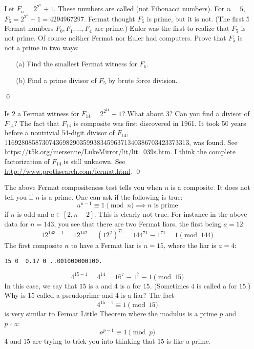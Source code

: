 \begin{ex}
  Let $F_n = 2^{2^n} + 1$.
  These numbers are called  (not Fibonacci numbers).
  For $n = 5$, $F_5 = 2^{2^5} + 1 = 4294967297$.
  Fermat thought $F_5$ is prime, but it is not.
  (The first 5 Fermat numbers $F_0, F_1, ..., F_4$ are prime.)
  Euler was the first to realize that $F_5$ is not prime.
  Of course neither Fermat nor Euler had computers.
  Prove that $F_5$ is not a prime in two ways:
  \begin{enumerate}[nosep]
    \item[(a)] Find the smallest Fermat witness for $F_5$.
    \item[(b)] Find a prime divisor of $F_5$ by brute force division.
  \end{enumerate}
  \qed
\end{ex}

\begin{ex}
  Is $2$ a Fermat witness for $F_{14} = 2^{2^{14}} + 1$?
  What about $3$?
  Can you find a divisor of $F_{14}$?
  The fact that $F_{14}$ is composite was first discovered in 1961.
  It took 50 years before a nontrivial 54-digit divisor of $F_{14}$,
  116928085873074369829035993834596371340386703423373313,
  was found.
  See \url{https://t5k.org/mersenne/LukeMirror/lit/lit_039s.htm}.
  I think the complete factorization of $F_{14}$ is still unknown.
  See \url{http://www.prothsearch.com/fermat.html}.
  \qed
\end{ex}

The above Fermat compositeness test tells you when $n$ is a composite.
It does not tell you if $n$ is a prime.
One can ask if the following is true: 
\[
a^{n-1} \equiv 1 \pmod{n} \implies n \text{ is prime}
\]
if $n$ is odd and $a \in [2, n-2]$.
This is clearly not true.
For instance in the above data for $n = 143$, you see that
there are two Fermat liars, the first being $a = 12$:
\[
12^{143 - 1} = 12^{142} = (12^2)^{71} = 144^{71} \equiv 1^{71} = 1 \pmod{144}
\]
The first composite $n$ to have a Fermat liar is $n = 15$, where the liar is $a = 4$:
\begin{Verbatim}[frame=single,fontsize=\footnotesize]
15 0  0.17 0 ..001000000100.
\end{Verbatim}
\[
4^{15 - 1} = 4^{14} = 16^7 \equiv 1^7 \equiv 1 \pmod{15} 
\]  
In this case,
we say that $15$ is a
and
$4$ is a
for $15$.
(Sometimes $4$ is called a
 for $15$.)
Why is $15$ called a pseudoprime and $4$ is a liar?
The fact
\[
4^{15 - 1} \equiv 1 \pmod{15} 
\]
is very similar to Fermat Little Theorem where the modulus is a prime $p$ and $p \nmid a$:
\[
a^{p - 1} \equiv 1 \pmod{p} 
\]
$4$ and $15$ are trying to trick you into thinking that $15$ is like a prime. 

